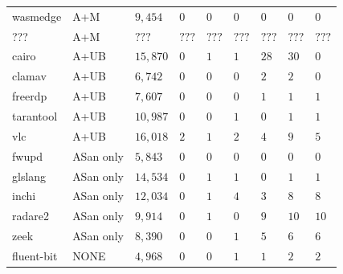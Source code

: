 \begin{table}[h!]
{\begin{tabular}{|l|l|l|l|l|l|l|l|l|}
wasmedge         & A+M                 & $9,454$             & $0$              & $0$           & $0$           & $0$            & $0$             & $0$                 \\
???         & A+M                 & $???$             & $???$              & $???$           & $???$           & $???$            & $???$             & $???$                 \\
\hline
cairo            & A+UB                & $15,870$            & $0$              & $1$           & $1$           & $28$           & $30$            & $0$                 \\
clamav           & A+UB                & $6,742$             & $0$              & $0$           & $0$           & $2$            & $2$             & $0$                 \\
freerdp          & A+UB                & $7,607$             & $0$              & $0$           & $0$           & $1$            & $1$             & $1$                 \\
tarantool        & A+UB                & $10,987$            & $0$              & $0$           & $1$           & $0$            & $1$             & $1$                 \\
vlc              & A+UB                & $16,018$            & $2$              & $1$           & $2$           & $4$            & $9$             & $5$                 \\ 
\hline
fwupd            & ASan only                & $5,843$             & $0$              & $0$           & $0$           & $0$            & $0$             & $0$                 \\
glslang          & ASan only                & $14,534$            & $0$              & $1$           & $1$           & $0$            & $1$             & $1$                 \\
inchi            & ASan only                & $12,034$            & $0$              & $1$           & $4$           & $3$            & $8$             & $8$                 \\
radare2          & ASan only                & $9,914$             & $0$              & $1$           & $0$           & $9$            & $10$            & $10$                \\
zeek             & ASan only                & $8,390$             & $0$              & $0$           & $1$           & $5$            & $6$             & $6$                 \\ 
\hline
fluent-bit       & NONE                & $4,968$             & $0$              & $0$           & $1$           & $1$            & $2$             & $2$                 \\

\end{tabular}}
\end{table}
